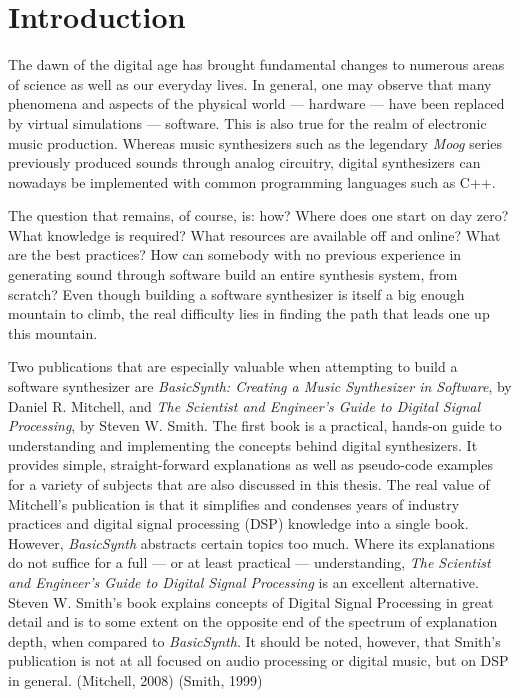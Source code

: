 \chapter*{Introduction}

The dawn of the digital age has brought fundamental changes to numerous areas of science as well as our everyday lives. In general, one may observe that many phenomena and aspects of the physical world --- hardware --- have been replaced by virtual simulations --- software. This is also true for the realm of electronic music production. Whereas music synthesizers such as the legendary \emph{Moog}\footnotemark{} series previously produced sounds through analog circuitry, digital synthesizers can nowadays be implemented with common programming languages such as C++.\parbreak


The question that remains, of course, is: how? Where does one start on day zero? What knowledge is required? What resources are available off and online? What are the best practices? How can somebody with no previous experience in generating sound through software build an entire synthesis system, from scratch? Even though building a software synthesizer is itself a big enough mountain to climb, the real difficulty lies in finding the path that leads one up this mountain. \parbreak

Two publications that are especially valuable when attempting to build a software synthesizer are \emph{BasicSynth: Creating a Music Synthesizer in Software}, by Daniel R. Mitchell, and \emph{The Scientist and Engineer's Guide to Digital Signal Processing}, by Steven W. Smith. The first book is a practical, hands-on guide to understanding and implementing the concepts behind digital synthesizers. It provides simple, straight-forward explanations as well as pseudo-code examples for a variety of subjects that are also discussed in this thesis. The real value of Mitchell's publication is that it simplifies and condenses years of industry practices and digital signal processing (DSP) knowledge into a single book. However, \emph{BasicSynth} abstracts certain topics too much. Where its explanations do not suffice for a full --- or at least practical --- understanding, \emph{The Scientist and Engineer's Guide to Digital Signal Processing} is an excellent alternative. Steven W. Smith's book explains concepts of Digital Signal Processing in great detail and is to some extent on the opposite end of the spectrum of explanation depth, when compared to \emph{BasicSynth}. It should be noted, however, that Smith's publication is not at all focused on audio processing or digital music, but on DSP in general. (Mitchell, 2008) (Smith, 1999)\parbreak


